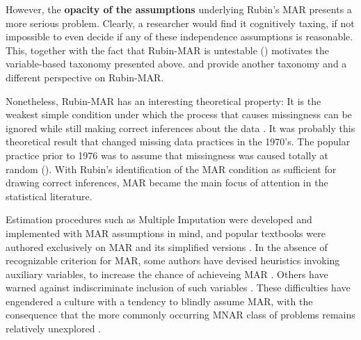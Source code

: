 \documentclass[12pt]{article}
\newcommand{\compos}{\mbox{$\bot\!\!\!\bot$}}
\begin{document}
However, the \textbf{opacity of the assumptions} underlying Rubin's
MAR presents a more serious problem.
Clearly, a researcher would find it cognitively taxing, if
not impossible to even decide if any of these independence assumptions is  
reasonable. This, together
with the fact that
Rubin-MAR is untestable (\cite{impute})  motivates
the variable-based taxonomy presented above. \cite{seaman2013meant} and \cite{doretti2018missing} provide another taxonomy and a different perspective on Rubin-MAR.


Nonetheless, Rubin-MAR has an interesting theoretical property:  
It is the  weakest simple condition under
which the process that causes
missingness can be ignored while still making correct inferences about the data \citep{Rubin_missing}.
It was probably this theoretical result that
changed missing data practices in the 1970's.
The popular practice prior to 1976 
was to assume that missingness was caused
totally at random (\cite{gleason1975proposal,
haitovsky1968missing}). With Rubin's identification of the
MAR condition as sufficient for drawing correct inferences,
MAR became the main focus of attention in the statistical literature.

Estimation procedures such as Multiple Imputation were developed and implemented with
MAR assumptions in mind, and popular textbooks were authored
exclusively on MAR and its simplified versions \citep{grahambook}.
In the absence of recognizable criterion for MAR, some
authors have devised heuristics invoking auxiliary
variables, to increase the chance of achieveing MAR
\citep{collins2001comparison}. Others have warned against indiscriminate
inclusion of such variables \citep{felix2013,felix2015}.
These difficulties have engendered a culture with a tendency to
blindly assume MAR, with the consequence that
the more commonly occurring MNAR class of problems
remains relatively unexplored
\citep{resseguier2011sensitivity, adams2007researching, osborne2012best, osborne2014best,
	sverdlov2015modern,  van2016incremental}. 
\end{document}
